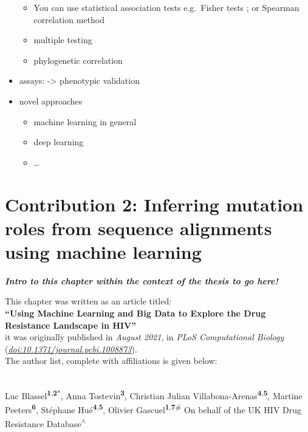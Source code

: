 \documentclass[
  11pt,
  twoside]{scrbook}
\providecommand{\tightlist}{%
  \setlength{\itemsep}{0pt}\setlength{\parskip}{0pt}}
\begin{document}
\begin{itemize}
  \begin{itemize}
  \tightlist
  \item
    You can use statistical association tests e.g.~Fisher tests \autocite{villabona-arenasIndepthAnalysisHIV12016,shulmanGeneticCorrelatesEfavirenz2004}; or Spearman correlation method \autocite{millerGenotypicPhenotypicPredictors2004}
  \item
    multiple testing
  \item
    phylogenetic correlation
  \end{itemize}
\item
  assays: -\textgreater{} phenotypic validation
\item
  novel approaches

  \begin{itemize}
  \tightlist
  \item
    machine learning in general
  \item
    deep learning
  \item
    \ldots{}
  \end{itemize}
\end{itemize}

\printbibliography[segment=\therefsegment,heading=subbibintoc,title={References for chapter \thechapter}]

\hypertarget{HIV-paper}{%
\chapter{Contribution 2: Inferring mutation roles from sequence alignments using machine learning}\label{HIV-paper}}

\textbf{\emph{Intro to this chapter within the context of the thesis to go here!}}

This chapter was written as an article titled:\\
\textbf{``Using Machine Learning and Big Data to Explore the Drug Resistance Landscape in HIV''}\\
it was originally published in \emph{August 2021}, in \emph{PLoS Computational Biology}
(\href{https://doi.org/10.1371/journal.pcbi.1008873}{\emph{doi:10.1371/journal.pcbi.1008873}}).\\
The author list, complete with affiliations is given below:\\
\strut \\

Luc Blassel\textsuperscript{\textbf{1},\textbf{2}*}, Anna Tostevin\textsuperscript{\textbf{3}}, Christian Julian
Villabona-Arenas\textsuperscript{\textbf{4},\textbf{5}}, Martine Peeters\textsuperscript{\textbf{6}}, Stéphane Hué\textsuperscript{\textbf{4},\textbf{5}}, Olivier
Gascuel\textsuperscript{\textbf{1},\textbf{7}\#} On behalf of the UK HIV Drug Resistance
Database\textsuperscript{\(\wedge\)}\\
\end{document}
